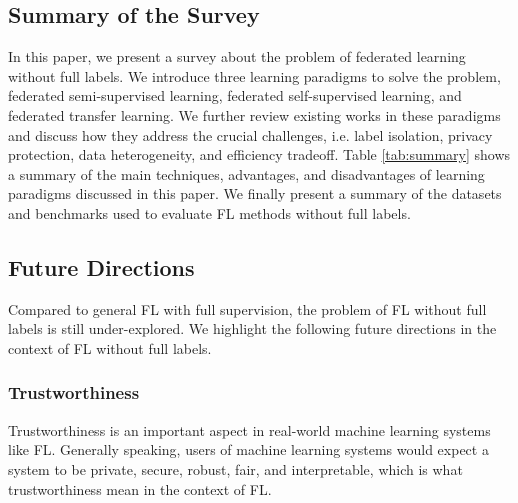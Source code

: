 \documentclass[11pt]{article}
\begin{document}
\subsection{Summary of the Survey}
In this paper, we present a survey about the problem of federated learning without full labels. We introduce three learning paradigms to solve the problem, federated semi-supervised learning, federated self-supervised learning, and federated transfer learning. We further review existing works in these paradigms and discuss how they address the crucial challenges, i.e. label isolation, privacy protection, data heterogeneity, and efficiency tradeoff. Table \ref{tab:summary} shows a summary of the main techniques, advantages, and disadvantages of learning paradigms discussed in this paper. We finally present a summary of the datasets and benchmarks used to evaluate FL methods without full labels. 

\subsection{Future Directions}
Compared to general FL with full supervision, the problem of FL without full labels is still under-explored. We highlight the following future directions in the context of FL without full labels. 

\subsubsection{Trustworthiness}
Trustworthiness is an important aspect in real-world machine learning systems like FL. Generally speaking, users of machine learning systems would expect a system to be private, secure, robust, fair, and interpretable, which is what trustworthiness mean in the context of FL. 
\end{document}
